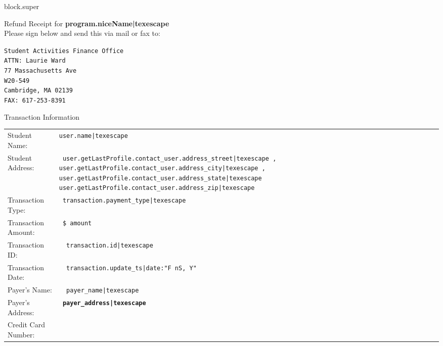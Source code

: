 {%


{%
{{ block.super }}

{\huge Refund Receipt for {\bf {{ program.niceName|texescape }} }} \\

{\large Please sign below and send this via mail or fax to:} \\

\begin{boxedminipage}{2.75in}
\begin{center}
\texttt{Student Activities Finance Office \\
ATTN: Laurie Ward \\
77 Massachusetts Ave \\
W20-549 \\
Cambridge, MA 02139 \\
FAX: 617-253-8391 }
\end{center}
\end{boxedminipage}

\vspace{.4in}

{\Large Transaction Information } 
\vspace{.1in}

\begin{tabular}{ll}

Student Name: &\texttt{ {{user.name|texescape }}} \\
Student Address: &\texttt{ {{user.getLastProfile.contact_user.address_street|texescape }}, 
{{ user.getLastProfile.contact_user.address_city|texescape }}, {{ user.getLastProfile.contact_user.address_state|texescape }} {{ user.getLastProfile.contact_user.address_zip|texescape }}
} \\
Transaction Type: &\texttt{ {{transaction.payment_type|texescape }} } \\
Transaction Amount: &\texttt{ \${{ amount }} } \\
Transaction ID: &\texttt{ {{ transaction.id|texescape }} } \\
Transaction Date: &\texttt{ {{ transaction.update_ts|date:"F nS, Y" }} }\\
Payer's Name: &\texttt{ {{ payer_name|texescape }} } \\
Payer's Address: &{\large \texttt{ {\bf {{ payer_address|texescape }}}} } \\
Credit Card Number: & \texttt{ \rule{3.5in}{0.25pt} } \\
\end{tabular}
\vspace{.5in}
\\

}}
